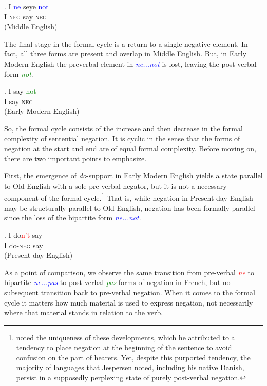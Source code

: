 \documentclass[linguex]{sp}
\theoremstyle{definition} \newtheorem{definition}{Definition}
\begin{document}
\exg. I \textcolor{blue}{ne} seye \textcolor{blue}{not}\\
      I \textsc{neg} say \textsc{neg}\\
      (Middle English)

The final stage in the formal cycle is a return to a single negative element. In fact, all three forms are present and overlap in Middle English. But, in Early Modern English the preverbal element in \emph{\textcolor{blue}{ne...not}} is lost, leaving the post-verbal form \emph{\textcolor{green}{not}}. 

\exg. I say \textcolor{green}{not}\\
      I say \textsc{neg}\\
      (Early Modern English)

So, the formal cycle consists of the increase and then decrease in the formal complexity of sentential negation. It is cyclic in the sense that the forms of negation at the start and end are of equal formal complexity. Before moving on, there are two important points to emphasize.

First, the emergence of \emph{do}-support in Early Modern English yields a state parallel to Old English with a sole pre-verbal negator, but it is not a necessary component of the formal cycle.\footnote{\citet[10]{jespersen:1917} noted the uniqueness of these developments, which he attributed to a tendency to place negation at the beginning of the sentence to avoid confusion on the part of hearers. Yet, despite this purported tendency, the majority of languages that Jespersen noted, including his native Danish, persist in a supposedly perplexing state of purely post-verbal negation.} That is, while negation in Present-day English may be structurally parallel to Old English, negation has been formally parallel since the loss of the bipartite form \emph{\textcolor{blue}{ne...not}}.

\exg. I do\textcolor{red}{n't} say\\
      I do-\textsc{neg} say\\
      (Present-day English)

As a point of comparison, we observe the same transition from pre-verbal \emph{\textcolor{red}{ne}} to bipartite \emph{\textcolor{blue}{ne...pas}} to post-verbal \emph{\textcolor{green}{pas}} forms of negation in French, but no subsequent transition back to pre-verbal negation. When it comes to the formal cycle it matters how much material is used to express negation, not necessarily where that material stands in relation to the verb.
\end{document}
